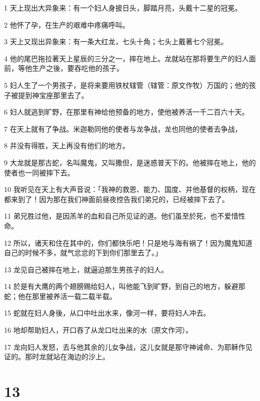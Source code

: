 \par 1 天上现出大异象来：有一个妇人身披日头，脚踏月亮，头戴十二星的冠冕。
\par 2 他怀了孕，在生产的艰难中疼痛呼叫。
\par 3 天上又现出异象来：有一条大红龙，七头十角；七头上戴著七个冠冕。
\par 4 他的尾巴拖拉著天上星辰的三分之一，摔在地上。龙就站在那将要生产的妇人面前，等他生产之後，要吞吃他的孩子。
\par 5 妇人生了一个男孩子，是将来要用铁杖辖管（辖管：原文作牧）万国的；他的孩子被提到神宝座那里去了。
\par 6 妇人就逃到旷野，在那里有神给他预备的地方，使他被养活一千二百六十天。
\par 7 在天上就有了争战。米迦勒同他的使者与龙争战，龙也同他的使者去争战，
\par 8 并没有得胜，天上再没有他们的地方。
\par 9 大龙就是那古蛇，名叫魔鬼，又叫撒但，是迷惑普天下的。他被摔在地上，他的使者也一同被摔下去。
\par 10 我听见在天上有大声音说：「我神的救恩、能力、国度、并他基督的权柄，现在都来到了！因为那在我们神面前昼夜控告我们弟兄的，已经被摔下去了。
\par 11 弟兄胜过他，是因羔羊的血和自己所见证的道。他们虽至於死，也不爱惜性命。
\par 12 所以，诸天和住在其中的，你们都快乐吧！只是地与海有祸了！因为魔鬼知道自己的时候不多，就气忿忿的下到你们那里去了。」
\par 13 龙见自己被摔在地上，就逼迫那生男孩子的妇人。
\par 14 於是有大鹰的两个翅膀赐给妇人，叫他能飞到旷野，到自己的地方，躲避那蛇；他在那里被养活一载二载半载。
\par 15 蛇就在妇人身後，从口中吐出水来，像河一样，要将妇人冲去。
\par 16 地却帮助妇人，开口吞了从龙口吐出来的水（原文作河）。
\par 17 龙向妇人发怒，去与他其余的儿女争战，这儿女就是那守神诫命、为耶稣作见证的。那时龙就站在海边的沙上。

\chapter{13}

